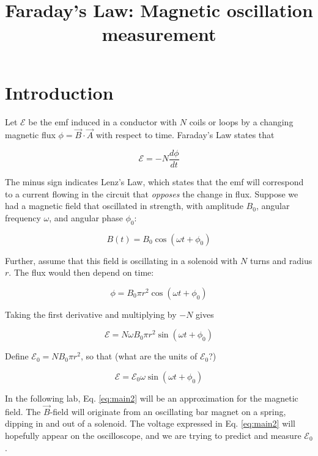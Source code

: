 \documentclass[12pt]{article}
\title{Faraday's Law: Magnetic oscillation measurement}
\begin{document}
\maketitle

\section{Introduction}

Let $\mathcal{E}$ be the emf induced in a conductor with $N$ coils or loops by a changing magnetic flux $\phi = \vec{B} \cdot \vec{A}$ with respect to time.  Faraday's Law states that

\begin{equation}
\mathcal{E} = -N \frac{d\phi}{dt}
\end{equation}

The minus sign indicates Lenz's Law, which states that the emf will correspond to a current flowing in the circuit that \textit{opposes} the change in flux.  Suppose we had a magnetic field that oscillated in strength, with amplitude $B_0$, angular frequency $\omega$, and angular phase $\phi_0$:

\begin{equation}
B(t) = B_0 \cos(\omega t + \phi_0)
\end{equation}

Further, assume that this field is oscillating in a solenoid with $N$ turns and radius $r$.  The flux would then depend on time:

\begin{equation}
\phi = B_0 \pi r^2 \cos(\omega t + \phi_0)
\end{equation}

Taking the first derivative and multiplying by $-N$ gives

\begin{equation}
\mathcal{E} = N \omega B_0 \pi r^2 \sin(\omega t + \phi_0) \label{eq:main}
\end{equation}

Define $\mathcal{E}_0 = N B_0 \pi r^2$, so that (what are the units of $\mathcal{E}_0$?)

\begin{equation}
\mathcal{E} = \mathcal{E}_0 \omega \sin(\omega t + \phi_0) \label{eq:main2}
\end{equation}

In the following lab, Eq. \ref{eq:main2} will be an approximation for the magnetic field.  The $\vec{B}$-field will originate from an oscillating bar magnet on a spring, dipping in and out of a solenoid.  The voltage expressed in Eq. \ref{eq:main2} will hopefully appear on the oscilloscope, and we are trying to predict and measure $\mathcal{E}_0$.
\end{document}
